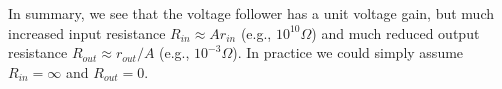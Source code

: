 \begin{itemize}
  In summary, we see that the voltage follower has a unit voltage gain, but
  much increased input resistance $R_{in}\approx A r_{in}$ (e.g., $10^{10}\Omega$)
  and much reduced output resistance $R_{out}\approx r_{out}/A$ (e.g., $10^{-3} \Omega$).
  In practice we could simply assume $R_{in}=\infty$ and $R_{out}=0$.



  \begin{comment}
    \htmladdimg{../figures/VoltageFollowerModel.png}

  \begin{itemize}
    \item {\bf Open-circuit voltage gain $G_{oc}$:} Assume an ideal source 
      voltage $v_s$ ($R_s=0$) is applied to the input of the circuit and 
      the output port is open circuit $R_L=\infty$. Then applying KVL to 
      the loop, we get
      \[
      v_s=(r_{in}+r_{out})i_{in}+A(v^+-v^-)=(r_{in}+r_{out})i_{in}+Ar_{in}i_{in}
      =[(A+1)r_{in}+r_{out}]i_{in} 
      \]
      Note that the internal voltage source is $A(v^+-v^-)=r_{in}i_{in}$. 
      The output voltage is:
      \[
      v_{out}=Ar_{in}i_{in}+r_{out}i_{in}=(Ar_{in}+r_{out})i_{in} 
      \]
      and the open-circuit voltage gain is:
      \[ 
      G_{oc}=\frac{v_{out}}{v_s}=\frac{Ar_{in}+r_{out}}{(A+1)r_{in}+r_{out}} 
      \approx 1
      \]
      Since $A>>1$, $G_{oc}\approx 1$ is approximately unity.
    \item {\bf Input resistance $R_{in}$:} 
      We now connect a load $R_L$ to the output port, while still keeping $R_S=0$ 
      (as it is irrelevant to $R_{in}$). Applying KVL to the two loops we get:
      \[ 
      \left\{ \begin{array}{l}
	v_s=(r_{in}+r_{out})i_{in}-r_{out}i_{out}+A r_{in}i_{in} \\
	A r_{in}i_{in}=(r_{out}+R_L)i_{out}-r_{out}i_{in} \right. \end{array} 
      \]
      Solving these two equations for the loop currents $i_{in}$ and $i_{out}$ we get
      \[ 
      i_{in}=\frac{v_s}{(A+1)r_{in}+r_{out}(R_L-Ar_{in})/(R_L+r_{out})} 
      \]
      The input resistance can be found as the ratio of the input voltage and current:
      \begin{eqnarray}
	R_{in}&=&\frac{v_s}{i_{in}}
	=(A+1)r_{in}+r_{out}\frac{R_L-Ar_{in}}{R_L+r_{out}} 
	=\frac{(A+1)r_{in}(R_L+r_{out})}{R_L+r_{out}}+r_{out}\frac{R_L-Ar_{in}}{R_L+r_{out}} 
	=r_{in}\frac{r_{out}+(A+1)R_L}{R_L+r_{out}}+\frac{R_L r_{out}}{R_L+r_{out}}
	\nonumber \\
	&=&r_{in}\frac{r_{out}+(A+1)R_L}{R_L+r_{out}}+R_L|| r_{out}      
	\nonumber 
      \end{eqnarray}
      Note that $R_{in}$ is affected by the load $R_L$. As usually $r_{out}$ is very
      small in comparison with all other resistances in the expression, it can be 
      dropped and the above becomes approximately
      \[ R_{in}\approx Ar_{in} \]
    \item {\bf Output resistance $R_{out}$:} This is the ratio $R_{out}=v_{oc}/i_{sc}$
      between the open-circuit voltage $v_{oc}$ and the short-circuit current $i_{sc}$.


\end{comment}
\end{itemize}
